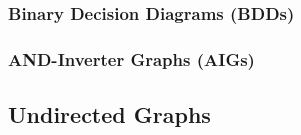 \subsubsection{Binary Decision Diagrams (BDDs)}
\label{sssec:BinaryDecisionDiagramsBDDs}




\subsubsection{AND-Inverter Graphs (AIGs)}
\label{sssec:ANDInverterGraphsAIGs}













\subsection{Undirected Graphs}
\label{ssec:UndirectedGraphs}















